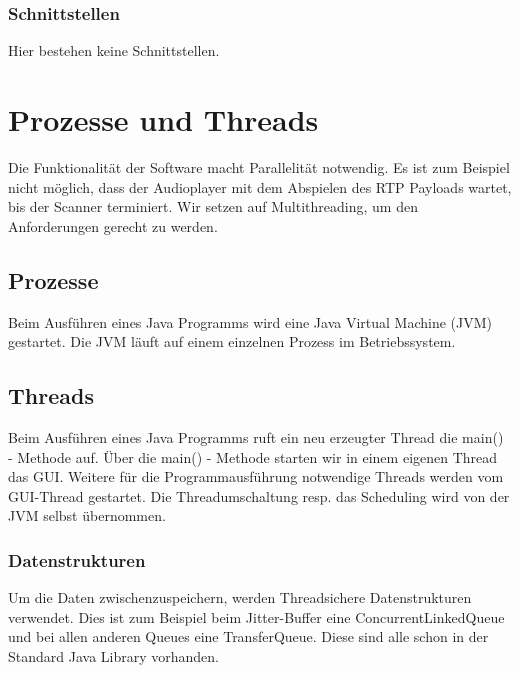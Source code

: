 \documentclass[a4,12pt]{scrartcl}
\begin{document}
\subsubsection{Schnittstellen}
Hier bestehen keine Schnittstellen.



\section{Prozesse und Threads}
Die Funktionalität der Software macht Parallelität notwendig. Es ist zum Beispiel nicht möglich, dass der Audioplayer mit dem Abspielen des RTP Payloads wartet, bis der Scanner terminiert. Wir setzen auf Multithreading, um den Anforderungen gerecht zu werden.
\subsection{Prozesse}
Beim Ausführen eines Java Programms wird eine Java Virtual Machine (JVM) gestartet. Die JVM läuft auf einem einzelnen Prozess im Betriebssystem. 
\subsection{Threads}
Beim Ausführen eines Java Programms ruft ein neu erzeugter Thread die main() - Methode auf. Über die main() - Methode starten wir in einem eigenen Thread das GUI. Weitere für die Programmausführung notwendige Threads werden vom GUI-Thread gestartet. Die Threadumschaltung resp. das Scheduling wird von der JVM selbst übernommen.
\subsubsection{Datenstrukturen}
Um die Daten zwischenzuspeichern, werden Threadsichere Datenstrukturen verwendet. Dies ist zum Beispiel beim Jitter-Buffer eine ConcurrentLinkedQueue und bei allen anderen Queues eine TransferQueue. Diese sind alle schon in der Standard Java Library vorhanden.
\end{document}
